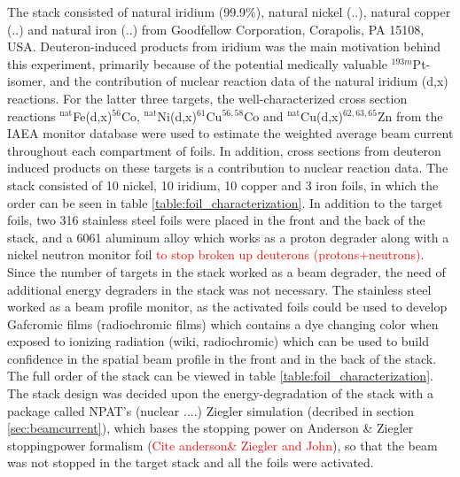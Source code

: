 \noindent 
 The stack consisted of natural iridium (99.9\%), natural nickel (..), natural copper (..) and natural iron (..) from Goodfellow Corporation, Corapolis, PA 15108, USA. Deuteron-induced products from iridium was the main motivation behind this experiment, primarily because of the potential medically valuable $^{193m}$Pt-isomer, and the contribution of nuclear reaction data of the natural iridium (d,x) reactions. For the latter three targets, the well-characterized cross section reactions $^\text{nat}$Fe(d,x)$^{56}$Co, $^\text{nat}$Ni(d,x)$^{61}$Cu$^{56,58}$Co and $^\text{nat}$Cu(d,x)$^{62,63,65}$Zn from the IAEA monitor database\cite{Hermanne2018a} were used to estimate the weighted average beam current throughout each compartment of foils. In addition, cross sections from deuteron induced products on these targets is a contribution to nuclear reaction data. The stack consisted of 10 nickel, 10 iridium, 10 copper and 3 iron foils, in which the order can be seen in table \ref{table:foil_characterization}. In addition to the target foils, two 316 stainless steel foils were placed in the front and the back of the stack, and a 6061 aluminum alloy which works as a proton degrader along with a nickel neutron monitor foil \textcolor{red}{to stop broken up deuterons (protons+neutrons)}. Since the number of targets in the stack worked as a beam degrader, the need of additional energy degraders in the stack was not necessary. The stainless steel worked as a beam profile monitor, as the activated foils could be used to develop Gafcromic films (radiochromic films) which contains a dye changing color when exposed to ionizing radiation (wiki, radiochromic) which can be used to build confidence in the spatial beam profile in the front and in the back of the stack. The full order of the stack can be viewed in table \ref{table:foil_characterization}. The stack design was decided upon the energy-degradation  of the stack with a package called NPAT's (nuclear ....) Ziegler simulation (decribed in section \ref{sec:beamcurrent}), which bases the stopping power on Anderson \& Ziegler stoppingpower formalism (\textcolor{red}{Cite anderson\& Ziegler and John}), so that the beam was not stopped in the target stack and all the foils were activated.  

\noindent 


